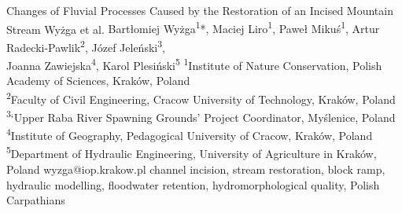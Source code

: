 \abstract
{Changes of Fluvial Processes Caused by the Restoration of
	an Incised Mountain Stream
} %
{Wyżga et al.} %
{Bartłomiej Wyżga\textsuperscript{1}*, Maciej Liro\textsuperscript{1}, Paweł Mikuś\textsuperscript{1}, Artur Radecki-Pawlik\textsuperscript{2}, Józef Jeleński\textsuperscript{3},\\Joanna Zawiejska\textsuperscript{4}, Karol Plesiński\textsuperscript{5}} %
{\TLtag} %
{\textsuperscript{1}Institute of Nature Conservation, Polish Academy of Sciences, Kraków, Poland\\
	\textsuperscript{2}Faculty of Civil Engineering, Cracow University of Technology, Kraków, Poland\\
	\textsuperscript{3}‘Upper Raba River Spawning Grounds’ Project Coordinator, Myślenice, Poland\\
	\textsuperscript{4}Institute of Geography, Pedagogical University of Cracow, Kraków, Poland\\
	\textsuperscript{5}Department of Hydraulic Engineering, University of Agriculture in Kraków, Poland
} %
{wyzga@iop.krakow.pl}  %
{channel incision, stream restoration, block ramp, hydraulic modelling, floodwater retention, hydromorphological quality, Polish Carpathians}%
